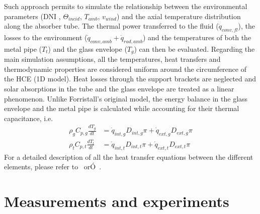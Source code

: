 \documentclass[final,3p,times,review]{elsarticle}
\begin{document}
%
Such approach permits to simulate the relationship between the environmental parameters (DNI , $\Theta_{incid}$, $T_{amb}$, $v_{wind}$) and the axial temperature distribution along the absorber tube. The thermal power transferred to the fluid ($\dot{q}_{conv,fl}$), the losses to the environment ($\dot{q}_{conv,amb} + \dot{q}_{rad,amb}$) and the temperatures of both the metal pipe ($T_{t}$) and the glass envelope ($T_{g}$) can then be evaluated. Regarding the main simulation assumptions, all the temperatures, heat transfers and thermodynamic properties are considered uniform around the circumference of the HCE (1D model). Heat losses through the support brackets are neglected and  solar absorptions in the tube and the glass envelope are treated as a linear phenomenon. Unlike Forristall's original model, the energy balance in the glass envelope and the metal pipe is calculated while accounting for their thermal capacitance, i.e.
\begin{align}
\rho_g C_{p,g} \frac{d T_g}{dt} & = \dot{q}_{int,g} D_{int,g} \pi + \dot{q}_{ext,g} D_{ext,g} \pi \\
\rho_t C_{p,t} \frac{d T_t}{dt} & = \dot{q}_{int,t} D_{int,t} \pi + \dot{q}_{ext,t} D_{ext,t} \pi
\end{align}
For a detailed description of all the heat transfer equations between the different elements, please refer to~\cite{Foristall2003} orÓ~\cite{Desideri2016thesis}. 


\section{Measurements and experiments}
\end{document}
